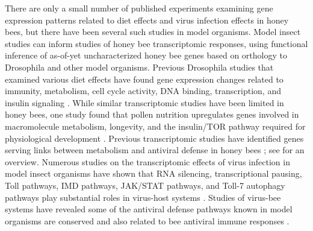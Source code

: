 \documentclass{bmcart}
\begin{document}
\begin{linenumbers}
\begin{doublespacing}
There are only a small number of published experiments examining gene expression patterns related to diet effects \cite{alaux2} and virus infection effects \cite{galbraith, Brutscher, Chen, Ryabov, Doublet} in honey bees, but there have been several such studies in model organisms. Model insect studies can inform studies of honey bee transcriptomic responses, using functional inference of as-of-yet uncharacterized honey bee genes based on orthology to Drosophila and other model organisms. Previous Drosophila studies that examined various diet effects have found gene expression changes related to immunity, metabolism, cell cycle activity, DNA binding, transcription, and insulin signaling \cite{sugarFat, sugarProtein, jHormone, alaux2}. While similar transcriptomic studies have been limited in honey bees, one study found that pollen nutrition upregulates genes involved in macromolecule metabolism, longevity, and the insulin/TOR pathway required for physiological development \cite{alaux2, Chen}. Previous transcriptomic studies have identified genes serving links between metabolism and antiviral defense in honey bees \cite{metabolismVirus, metabolismVirus1}; see \cite{metabolismVirusReview} for an overview. Numerous studies on the transcriptomic effects of virus infection in model insect organisms have shown that RNA silencing, transcriptional pausing, Toll pathways, IMD pathways, JAK/STAT pathways, and Toll-7 autophagy pathways play substantial roles in virus-host systems \cite{cherryReview, swevers}. Studies of virus-bee systems have revealed some of the antiviral defense pathways known in model organisms are conserved and also related to bee antiviral immune responses \cite{McMenamin}.


\end{doublespacing}
\end{linenumbers}
\end{document}
